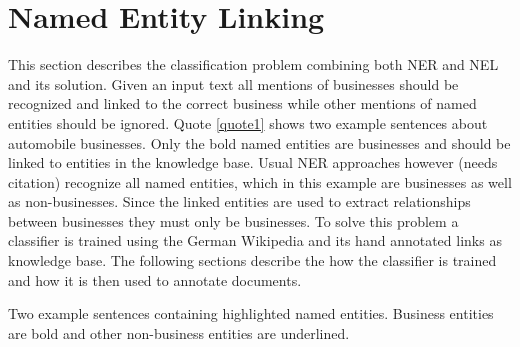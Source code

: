 \section{Named Entity Linking}
This section describes the classification problem combining both NER and NEL and its solution. Given an input text all mentions of businesses should be recognized and linked to the correct business while other mentions of named entities should be ignored. Quote \ref{quote1} shows two example sentences about automobile businesses. Only the bold named entities are businesses and should be linked to entities in the knowledge base. Usual NER approaches however (needs citation) recognize all named entities, which in this example are businesses as well as non-businesses. Since the linked entities are used to extract relationships between businesses they must only be businesses. To solve this problem a classifier is trained using the German Wikipedia and its hand annotated links as knowledge base. The following sections describe the how the classifier is trained and how it is then used to annotate documents.\\
\begin{nscenter}
	\begin{quotecaption}
	Two example sentences containing highlighted named entities. Business entities are bold and other non-business entities are underlined.
	\label{quote1}
	\end{quotecaption}
\end{nscenter}

